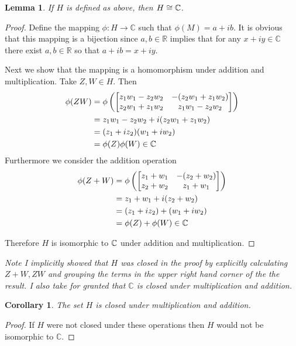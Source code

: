\documentclass[11pt]{amsart}
\def\complex{{\mathbb C}\/}
\newtheorem{corollary}{Corollary}
\newtheorem{lemma}{Lemma}
\begin{document}
\begin{lemma}
	If $H$ is defined as above, then $H \cong \complex$.
\end{lemma}
\begin{proof}
	Define the mapping $\phi: H \to \mathbb{C}$ such that $\phi(M) = a +ib$. It is obvious that this mapping is a bijection since $a,b \in\mathbb{R}$ implies that for any $x + iy \in \mathbb{C}$ there exist $a,b \in \mathbb{R}$ so that $a + ib = x + iy$.

	Next we show that the mapping is a homomorphism under addition and multiplication. Take $Z,W \in H$. Then
	\begin{equation*}
		\begin{aligned}
			\phi(ZW) &= \phi\left(\begin{bmatrix}
				z_1w_1 -z_2w_2 & -(z_2w_1 +z_1w_2) \\
				z_2w_1 +z_1w_2 & z_1w_1 -z_2w_2
			\end{bmatrix}\right) \\ &= z_1w_1 - z_2w_2 +i(z_2w_1 + z_1w_2) \\
			&= (z_1+iz_2)(w_1 + iw_2) \\
			&= \phi(Z)\phi(W) \in \complex
		\end{aligned}
	\end{equation*}
	Furthermore we consider the addition operation
	\begin{equation*}
		\begin{aligned}
			\phi(Z+W) &= \phi\left(\begin{bmatrix}
				z_1 + w_1 & -(z_2 + w_2) \\
				z_2 + w_2 & z_1 + w_1
			\end{bmatrix}\right) \\
			 &= z_1 + w_1 + i(z_2 + w_2) \\
			&= (z_1+iz_2) + (w_1 + iw_2) \\
			&= \phi(Z) + \phi(W) \in \complex
		\end{aligned}
	\end{equation*}

	Therefore $H$ is isomorphic to $\complex$ under addition and multiplication.

\end{proof}

\noindent	\emph{Note I implicitly showed that $H$ was closed in the proof by explicitly calculating $Z +W, ZW$ and grouping the terms in the upper right hand corner of the the result. I also take for granted that $\mathbb{C}$ is closed under multiplication and addition.}
\begin{corollary}
	The set $H$ is closed under multiplication and addition.
\end{corollary}
\begin{proof}
	If $H$ were not closed under these operations then $H$ would not be isomorphic to $\mathbb{C}$.
\end{proof}
\end{document}
